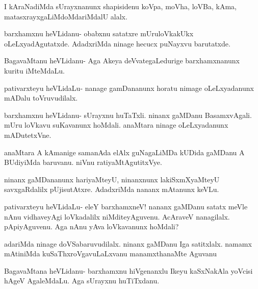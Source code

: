 \documentclass{article}
\begin{document}
\begin{mng}%
I kAraNadiMda sUrayxnanunx shapisidenu koVpa, moVha,
loVBa, kAma, matasxrayxgaLiMdoMdariMdalU alalx.
\end{mng}

\begin{mng}%
barxhamxnu heVLidanu- obabxnu satatxre mUruloVkakUkx oLeLxyadAgutatxde.
AdadxriMda ninage hecucx puNayxvu barutatxde.
\end{mng}

\begin{mng}%
BagavaMtanu heVLidanu- Aga Akeya deVvategaLedurige barxhamxnanunx
kuritu iMteMdaLu.
\end{mng}

\begin{mng}%
pativarxteyu heVLidaLu- nanage gamDananunx horatu nimage
oLeLxyadanunx mADalu toVruvudilalx.
\end{mng}

\begin{mng}%
barxhamxnu heVLidanu- sUrayxnu huTaTxli. ninanx gaMDanu BasamxvAgali.
mUru loVkavu suKavanunx hoMdali. anaMtara ninage oLeLxyadanunx
mADutetxVne.
\end{mng}

\begin{mng}%
anaMtara A kAmanige samanAda elAlx guNagaLiMDa kUDida
gaMDanu A BUdiyiMda baruvanu. niVnu ratiyaMtAgutitxVye.
\end{mng}

\begin{mng}%
ninanx gaMDananunx hariyaMteyU, ninanxnunx lakiSxmXyaMteyU
savxgaRdalilx pUjisutAtxre. AdadxriMda nananx mAtanunx keVLu.
\end{mng}

\begin{mng}%
pativarxteyu heVLidaLu- eleY barxhamxneV! nananx gaMDanu satatx
meVle nAnu vidhaveyAgi loVkadalilx niMditeyAguvenu. AcAraveV
nanagilalx. pApiyAguvenu. Aga nAnu yAva loVkavanunx hoMdali?
\end{mng}

\begin{mng}%
adariMda ninage doVSabaruvudilalx. ninanx gaMDanu Iga satitxlalx.
namamx mAtiniMda kuSaThxroVgavuLaLxvanu manamxthanaMte Aguvanu
\end{mng}

\begin{mng}%
BagavaMtana heVLidanu- barxhamxnu hiVgenanxlu Ikeyu kaSxNakAla 
yoVcisi hAgeV AgaleMdaLu. Aga sUrayxnu huTiTxdanu.
\end{mng}
\end{document}
